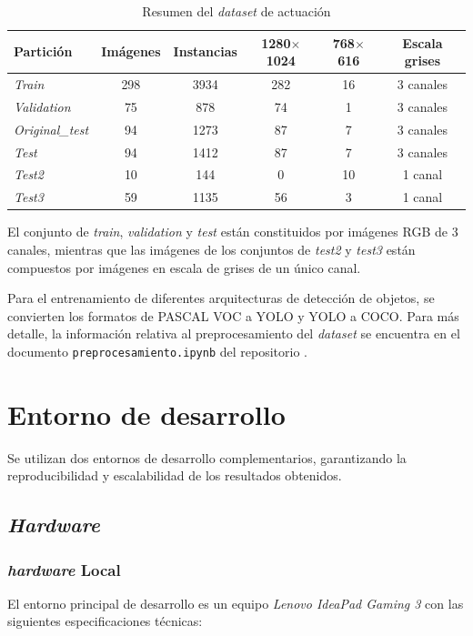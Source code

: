 \documentclass[12pt,a4paper,onecolumn,oneside]{report}
\begin{document}
\clearpage
\begin{table}[htbp]
\caption{Resumen del \textit{dataset} de actuación}
\centering
{}
\begin{tabular}{l c c c c c}
\toprule
\textbf{Partición} & \textbf{Imágenes} & \textbf{Instancias} & \textbf{1280$\times$1024} & \textbf{768$\times$616} & \textbf{Escala grises}\\
\midrule
\textit{Train}          & 298 & 3934 & 282 & 16 & 3 canales\\
\textit{Validation}     &  75 &  878 & 74  & 1  & 3 canales\\
\textit{Original\_test} &  94 & 1273 & 87  & 7  & 3 canales\\
\textit{Test}           &  94 & 1412 & 87  & 7  & 3 canales\\
\textit{Test2}          &  10 &  144 & 0   & 10 & 1 canal\\
\textit{Test3}          &  59 & 1135 & 56  & 3  & 1 canal\\
\bottomrule
\end{tabular}
\label{tab:dataset_final}
\end{table}

El conjunto de \textit{train}, \textit{validation} y \textit{test} están constituidos por imágenes RGB de 3 canales, mientras que las imágenes 
de los conjuntos de \textit{test2} y \textit{test3} están compuestos por imágenes en escala de grises de un único canal. 

Para el entrenamiento de diferentes arquitecturas de detección de objetos, se convierten los formatos de PASCAL VOC a YOLO y YOLO a COCO. 
Para más detalle, la información relativa al preprocesamiento del \textit{dataset} se encuentra en el documento \texttt{preprocesamiento.ipynb} del repositorio \cite{repoTFM}.

\section{Entorno de desarrollo}
\label{sec:Entorno de desarrollo}
Se utilizan dos entornos de desarrollo complementarios, garantizando la reproducibilidad y escalabilidad de los resultados obtenidos.

\subsection{\textit{Hardware}}
\subsubsection{\textit{hardware} Local}
\label{sec:hardware_local}
El entorno principal de desarrollo es un equipo \textit{Lenovo IdeaPad Gaming 3} con las siguientes especificaciones técnicas:
\end{document}
